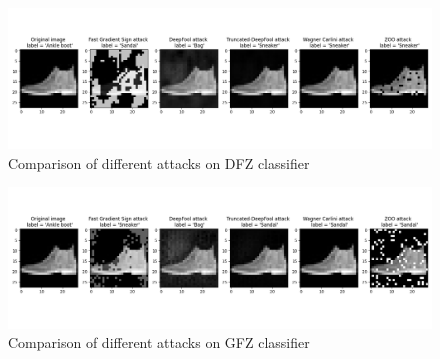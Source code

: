 \documentclass[11pt,twocolumn,letterpaper]{article}
\begin{document}
\begin{figure}[ht]
    \centering
    \includegraphics[width=\textwidth]{illustrations/attacks_sample_dfz.png}
    \caption{Comparison of different attacks on DFZ classifier}
    \label{fig:attacks_sample_dfz}
\end{figure}

\begin{figure}[ht]
    \centering
    \includegraphics[width=\textwidth]{illustrations/attacks_sample_gfz.png}
    \caption{Comparison of different attacks on GFZ classifier}
    \label{fig:attacks_sample_gfz}
\end{figure}
\end{document}

